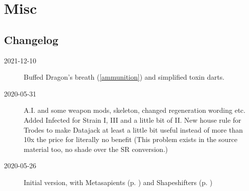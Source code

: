 \documentclass{book}
\begin{document}
\printindex

\appendix
\chapter{Misc}
\section{Changelog}
\begin{description}
	\item[2021-12-10] Buffed Dragon's breath (\ref{ammunition}) and simplified toxin darts.
	\item[2020-05-31] A.I. and some weapon mods, skeleton, changed regeneration wording etc. Added Infected \pageref{sec:gettinginfected} for Strain I, III and a little bit of II. New house rule for Trodes to make Datajack at least a little bit useful instead of more than 10x the price for literally no benefit (This problem exists in the source material too, no shade over the SR conversion.)
	\item[2020-05-26] Initial version, with Metasapients (p. \pageref{sec:metasapients}) and Shapeshifters (p. \pageref{sec:shapeshifters}) 
\end{description}
\end{document}
